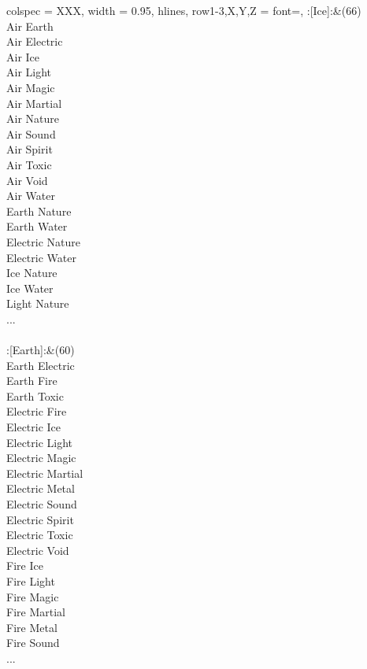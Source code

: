 \begin{longtblr}[
	caption = {1v2 Attacking Effective},
	label = {1v2-Attacking-Effective},
]{
	colspec = {XXX}, width = 0.95\linewidth,
	hlines,
	row{1-3,X,Y,Z} = {font=\bfseries},
}
	:[Ice]:&{(66)\\
	Air Earth \\
	Air Electric \\
	Air Ice \\
	Air Light \\
	Air Magic \\
	Air Martial \\
	Air Nature \\
	Air Sound \\
	Air Spirit \\
	Air Toxic \\
	Air Void \\
	Air Water \\
	Earth Nature \\
	Earth Water \\
	Electric Nature \\
	Electric Water \\
	Ice Nature \\
	Ice Water \\
	Light Nature \\
	...\\
	}\\

	:[Earth]:&{(60)\\
	Earth Electric \\
	Earth Fire \\
	Earth Toxic \\
	Electric Fire \\
	Electric Ice \\
	Electric Light \\
	Electric Magic \\
	Electric Martial \\
	Electric Metal \\
	Electric Sound \\
	Electric Spirit \\
	Electric Toxic \\
	Electric Void \\
	Fire Ice \\
	Fire Light \\
	Fire Magic \\
	Fire Martial \\
	Fire Metal \\
	Fire Sound \\
	...\\
	}\\


\end{longtblr}
